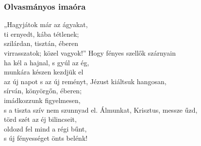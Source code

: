 \documentclass[twoside]{article}
\begin{document}

\subsubsection*{Olvasmányos imaóra}



\begin{hymnstanzas}
    „Hagyjátok már az ágyakat,\\
    ti ernyedt, kába tétlenek;\\
    szilárdan, tisztán, éberen\\
    virrasszatok; közel vagyok!”
\stanzabreak
    Hogy fényes szellők szárnyain\\
    ha kél a hajnal, s gyúl az ég,\\
    munkára készen kezdjük el\\
    az új napot s az új reményt,
\stanzabreak
    Jézust kiáltsuk hangosan,\\
    sírván, könyörgőn, éberen;\\
    imádkozzunk figyelmesen,\\
    s a tiszta szív nem szunnyad el.
\stanzabreak
    Álmunkat, Krisztus, messze űzd,\\
    törd szét az éj bilincseit,\\
    oldozd fel mind a régi bűnt,\\
    s új fényességet önts belénk!
\end{hymnstanzas}



\end{document}

